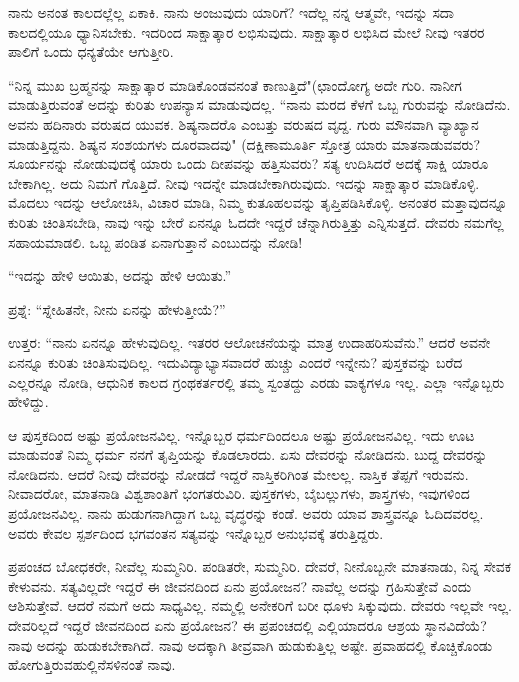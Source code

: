 ನಾನು ಅನಂತ ಕಾಲದಲ್ಲೆಲ್ಲ ಏಕಾಕಿ. ನಾನು ಅಂಜುವುದು ಯಾರಿಗೆ? ಇದೆಲ್ಲ ನನ್ನ ಆತ್ಮವೇ, ಇದನ್ನು ಸದಾ ಕಾಲದಲ್ಲಿಯೂ ಧ್ಯಾನಿಸಬೇಕು. ಇದರಿಂದ ಸಾಕ್ಷಾತ್ಕಾರ ಲಭಿಸುವುದು. ಸಾಕ್ಷಾತ್ಕಾರ ಲಭಿಸಿದ ಮೇಲೆ ನೀವು ಇತರರ ಪಾಲಿಗೆ ಒಂದು ಧನ್ಯತೆಯೇ ಆಗುತ್ತೀರಿ.

“ನಿನ್ನ ಮುಖ ಬ್ರಹ್ಮನನ್ನು ಸಾಕ್ಷಾತ್ಕಾರ ಮಾಡಿಕೊಂಡವನಂತೆ ಕಾಣುತ್ತಿದೆ"\break (ಛಾಂದೋಗ್ಯ  ಅದೇ ಗುರಿ. ನಾನೀಗ ಮಾಡುತ್ತಿರುವಂತೆ ಅದನ್ನು ಕುರಿತು ಉಪನ್ಯಾಸ ಮಾಡುವುದಲ್ಲ. “ನಾನು ಮರದ ಕೆಳಗೆ ಒಬ್ಬ ಗುರುವನ್ನು ನೋಡಿದೆನು. ಅವನು ಹದಿನಾರು ವರುಷದ ಯುವಕ. ಶಿಷ್ಯನಾದರೊ ಎಂಬತ್ತು ವರುಷದ ವೃದ್ದ. ಗುರು ಮೌನವಾಗಿ ವ್ಯಾಖ್ಯಾನ ಮಾಡುತ್ತಿದ್ದನು. ಶಿಷ್ಯನ ಸಂಶಯಗಳು ದೂರವಾದವು" (ದಕ್ಷಿಣಾಮೂರ್ತಿ ಸ್ತೋತ್ರ  ಯಾರು ಮಾತನಾಡುವವರು? ಸೂರ್ಯನನ್ನು ನೋಡುವುದಕ್ಕೆ ಯಾರು ಒಂದು ದೀಪವನ್ನು ಹತ್ತಿಸುವರು? ಸತ್ಯ ಉದಿಸಿದರೆ ಅದಕ್ಕೆ ಸಾಕ್ಷಿ ಯಾರೂ ಬೇಕಾಗಿಲ್ಲ. ಅದು ನಿಮಗೆ ಗೊತ್ತಿದೆ. ನೀವು ಇದನ್ನೇ ಮಾಡಬೇಕಾಗಿರುವುದು. ಇದನ್ನು ಸಾಕ್ಷಾತ್ಕಾರ ಮಾಡಿಕೊಳ್ಳಿ. ಮೊದಲು ಇದನ್ನು ಆಲೋಚಿಸಿ, ವಿಚಾರ ಮಾಡಿ, ನಿಮ್ಮ ಕುತೂಹಲವನ್ನು ತೃಪ್ತಿಪಡಿಸಿಕೊಳ್ಳಿ. ಅನಂತರ ಮತ್ತಾವುದನ್ನೂ ಕುರಿತು ಚಿಂತಿಸಬೇಡಿ, ನಾವು ಇನ್ನು ಬೇರೆ ಏನನ್ನೂ ಓದದೇ ಇದ್ದರೆ ಚೆನ್ನಾಗಿರುತ್ತಿತ್ತು ಎನ್ನಿಸುತ್ತದೆ. ದೇವರು ನಮಗೆಲ್ಲ ಸಹಾಯಮಾಡಲಿ. ಒಬ್ಬ ಪಂಡಿತ ಏನಾಗುತ್ತಾನೆ ಎಂಬುದನ್ನು ನೋಡಿ!

“ಇದನ್ನು ಹೇಳಿ ಆಯಿತು, ಅದನ್ನು ಹೇಳಿ ಆಯಿತು.”

ಪ್ರಶ್ನೆ: “ಸ್ನೇಹಿತನೇ, ನೀನು ಏನನ್ನು ಹೇಳುತ್ತೀಯೆ?”

ಉತ್ತರ: “ನಾನು ಏನನ್ನೂ ಹೇಳುವುದಿಲ್ಲ. ಇತರರ ಆಲೋಚನೆಯನ್ನು ಮಾತ್ರ ಉದಾಹರಿಸುವೆನು.” ಆದರೆ ಅವನೇ ಏನನ್ನೂ ಕುರಿತು ಚಿಂತಿಸುವುದಿಲ್ಲ. ಇದು\break ವಿದ್ಯಾಭ್ಯಾಸವಾದರೆ ಹುಚ್ಚು ಎಂದರೆ ಇನ್ನೇನು? ಪುಸ್ತಕವನ್ನು ಬರೆದ ಎಲ್ಲರನ್ನೂ ನೋಡಿ, ಆಧುನಿಕ ಕಾಲದ ಗ್ರಂಥಕರ್ತರಲ್ಲಿ ತಮ್ಮ ಸ್ವಂತದ್ದು ಎರಡು ವಾಕ್ಯಗಳೂ ಇಲ್ಲ. ಎಲ್ಲಾ ಇನ್ನೊಬ್ಬರು ಹೇಳಿದ್ದು.

ಆ ಪುಸ್ತಕದಿಂದ ಅಷ್ಟು ಪ್ರಯೋಜನವಿಲ್ಲ. ಇನ್ನೊಬ್ಬರ ಧರ್ಮದಿಂದಲೂ ಅಷ್ಟು ಪ್ರಯೋಜನವಿಲ್ಲ. ಇದು ಊಟ ಮಾಡುವಂತೆ ನಿಮ್ಮ ಧರ್ಮ ನನಗೆ ತೃಪ್ತಿಯನ್ನು ಕೊಡಲಾರದು. ಏಸು ದೇವರನ್ನು ನೋಡಿದನು. ಬುದ್ದ ದೇವರನ್ನು ನೋಡಿದನು. ಆದರೆ ನೀವು ದೇವರನ್ನು ನೋಡದೆ ಇದ್ದರೆ ನಾಸ್ತಿಕರಿಗಿಂತ ಮೇಲಲ್ಲ. ನಾಸ್ತಿಕ ತೆಪ್ಪಗೆ ಇರುವನು. ನೀವಾದರೋ, ಮಾತನಾಡಿ ವಿಶ್ವಶಾಂತಿಗೆ ಭಂಗತರುವಿರಿ. ಪುಸ್ತಕಗಳು, ಬೈಬಲ್ಲುಗಳು, ಶಾಸ್ತ್ರಗಳು, ಇವುಗಳಿಂದ ಪ್ರಯೋಜನವಿಲ್ಲ. ನಾನು ಹುಡುಗನಾಗಿದ್ದಾಗ ಒಬ್ಬ ವೃದ್ಧರನ್ನು ಕಂಡೆ. ಅವರು ಯಾವ ಶಾಸ್ತ್ರವನ್ನೂ ಓದಿದವರಲ್ಲ. ಅವರು ಕೇವಲ ಸ್ಪರ್ಶದಿಂದ ಭಗವಂತನ ಸತ್ಯವನ್ನು ಇನ್ನೊಬ್ಬರ ಅನುಭವಕ್ಕೆ ತರುತ್ತಿದ್ದರು.

ಪ್ರಪಂಚದ ಬೋಧಕರೇ, ನೀವೆಲ್ಲ ಸುಮ್ಮನಿರಿ. ಪಂಡಿತರೇ, ಸುಮ್ಮನಿರಿ. ದೇವರೆ, ನೀನೊಬ್ಬನೇ ಮಾತನಾಡು, ನಿನ್ನ ಸೇವಕ ಕೇಳುವನು. ಸತ್ಯವಿಲ್ಲದೇ ಇದ್ದರೆ ಈ ಜೀವನದಿಂದ ಏನು ಪ್ರಯೋಜನ? ನಾವೆಲ್ಲ ಅದನ್ನು ಗ್ರಹಿಸುತ್ತೇವೆ ಎಂದು ಆಶಿಸುತ್ತೇವೆ. ಆದರೆ ನಮಗೆ ಅದು ಸಾಧ್ಯವಿಲ್ಲ. ನಮ್ಮಲ್ಲಿ ಅನೇಕರಿಗೆ ಬರೀ ಧೂಳು ಸಿಕ್ಕುವುದು. ದೇವರು ಇಲ್ಲವೇ ಇಲ್ಲ. ದೇವರಿಲ್ಲದೆ ಇದ್ದರೆ ಜೀವನದಿಂದ ಏನು ಪ್ರಯೋಜನ? ಈ ಪ್ರಪಂಚದಲ್ಲಿ ಎಲ್ಲಿಯಾದರೂ ಆಶ್ರಯ ಸ್ಥಾನವಿದೆಯೆ? ನಾವು ಅದನ್ನು ಹುಡುಕಬೇಕಾಗಿದೆ. ನಾವು ಅದಕ್ಕಾಗಿ ತೀವ್ರವಾಗಿ ಹುಡುಕುತ್ತಿಲ್ಲ ಅಷ್ಟೇ. ಪ್ರವಾಹದಲ್ಲಿ ಕೊಚ್ಚಿಕೊಂಡು ಹೋಗುತ್ತಿರುವ\break ಹುಲ್ಲಿನೆಸಳಿನಂತೆ ನಾವು.

